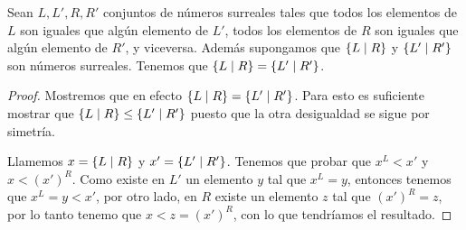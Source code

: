     \begin{theorem}
        Sean $L,L',R, R'$ conjuntos de n\'umeros surreales tales que todos los elementos de $L$ son iguales que alg\'un elemento de $L'$, todos los elementos de $R$ son iguales que alg\'un elemento de $R'$, y viceversa. Adem\'as supongamos que $\left\{L\mid R\right\}$ y $\left\{L'\mid R'\right\}$ son n\'umeros surreales. Tenemos que $\left\{L\mid R\right\} = \left\{L'\mid R'\right\}$.
    \end{theorem}

    \begin{proof}
        Mostremos que en efecto $\left\{L\mid R\right\} = \left\{L'\mid R'\right\}$. Para esto es suficiente mostrar que $\left\{L\mid R\right\} \le \left\{L'\mid R'\right\}$  puesto que la otra desigualdad se sigue por simetr\'ia.

        Llamemos $x = \left\{L\mid R\right\}$ y $x' = \left\{L'\mid R'\right\}$. Tenemos que probar que $x^L < x'$ y $x < (x')^R$. Como existe en $L'$ un elemento $y$ tal que $x^L = y$, entonces tenemos que $x^L = y < x'$, por otro lado, en $R$ existe un elemento $z$ tal que $(x')^R = z$, por lo tanto tenemo que $x < z = (x')^R$, con lo que tendr\'iamos el resultado.
    \end{proof}

    
    
